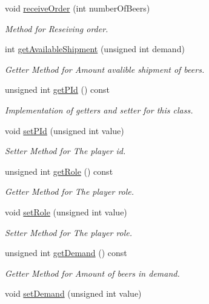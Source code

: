 \begin{DoxyCompactItemize}
void \hyperlink{classPlayer_af0df6a78d154f85b72869044a91adcf3}{receive\+Order} (int number\+Of\+Beers)
\begin{DoxyCompactList}\small\item\em Method for Reseiving order. \end{DoxyCompactList}\item 
int \hyperlink{classPlayer_a5e1a112bbb49e2896aa71aa8ffa02e90}{get\+Available\+Shipment} (unsigned int demand)
\begin{DoxyCompactList}\small\item\em Getter Method for Amount avalible shipment of beers. \end{DoxyCompactList}\item 
unsigned int \hyperlink{classPlayer_aec4626d021f2729c52306e7d303ddcff}{get\+P\+Id} () const
\begin{DoxyCompactList}\small\item\em Implementation of getters and setter for this class. \end{DoxyCompactList}\item 
void \hyperlink{classPlayer_a016beea94a91d74bc04d29088228316b}{set\+P\+Id} (unsigned int value)
\begin{DoxyCompactList}\small\item\em Setter Method for The player id. \end{DoxyCompactList}\item 
unsigned int \hyperlink{classPlayer_af78ce362224fb94149c6cf84dd34f9ea}{get\+Role} () const
\begin{DoxyCompactList}\small\item\em Getter Method for The player role. \end{DoxyCompactList}\item 
void \hyperlink{classPlayer_a008b3feee7ca705d7637cc3fbe5d7c58}{set\+Role} (unsigned int value)
\begin{DoxyCompactList}\small\item\em Setter Method for The player role. \end{DoxyCompactList}\item 
unsigned int \hyperlink{classPlayer_ade2a771c2e4a42560dae2acf2041ba8b}{get\+Demand} () const
\begin{DoxyCompactList}\small\item\em Getter Method for Amount of beers in demand. \end{DoxyCompactList}\item 
void \hyperlink{classPlayer_ad8d2808aaf6a627451a1d82f26d45812}{set\+Demand} (unsigned int value)

\end{DoxyCompactItemize}
